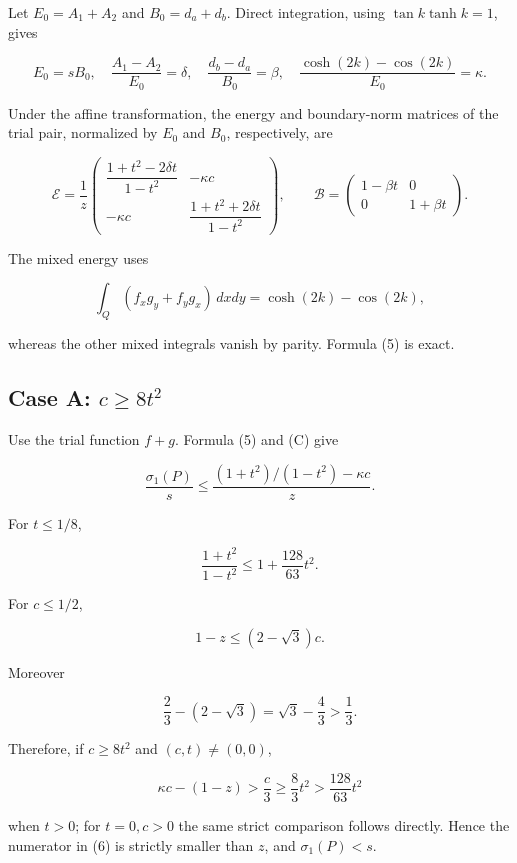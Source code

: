 \documentclass[11pt,a4paper]{article}
\begin{document}
Let \(E_0=A_1+A_2\) and \(B_0=d_a+d_b\). Direct integration, using
\(\tan k \tanh k=1\), gives

\[
E_0=sB_0,\quad
\frac{A_1-A_2}{E_0}=\delta,\quad
\frac{d_b-d_a}{B_0}=\beta,
\quad
\frac{\cosh(2k)-\cos(2k)}{E_0}=\kappa.
\]

Under the affine transformation, the energy and boundary-norm matrices
of the trial pair, normalized by \(E_0\) and \(B_0\), respectively, are

\[
\mathcal E=\frac1z
\begin{pmatrix}
\dfrac{1+t^2-2\delta t}{1-t^2}&-\kappa c\\[3pt]
-\kappa c&\dfrac{1+t^2+2\delta t}{1-t^2}
\end{pmatrix},
\qquad
\mathcal B=\begin{pmatrix}1-\beta t&0\\0&1+\beta t\end{pmatrix}.
\tag{5}
\]

The mixed energy uses

\[
\int_Q(f_xg_y+f_yg_x)\,dxdy
=\cosh(2k)-\cos(2k),
\]

whereas the other mixed integrals vanish by parity. Formula (5) is
exact.

\hypertarget{022-case-a-c8t2}{%
\subsection{\texorpdfstring{Case A:
\(c\ge 8t^2\)}{Case A: c >= 8t2}}\label{022-case-a-c8t2}}

Use the trial function \(f+g\). Formula (5) and (C) give

\[
\frac{\sigma_1(P)}s
\le\frac{(1+t^2)/(1-t^2)-\kappa c}{z}.
\tag{6}
\]

For \(t\le 1/8\),

\[
\frac{1+t^2}{1-t^2}\le1+\frac{128}{63}t^2.
\]

For \(c\le 1/2\),

\[
1-z\le(2-\sqrt3)c.
\]

Moreover

\[
\frac23-(2-\sqrt3)=\sqrt3-\frac43>\frac13.
\]

Therefore, if \(c\ge 8t^2\) and \((c,t)\ne (0,0)\),

\[
\kappa c-(1-z)>
\frac c3\ge\frac83t^2>\frac{128}{63}t^2
\]

when \(t>0\); for \(t=0,c>0\) the same strict comparison follows
directly. Hence the numerator in (6) is strictly smaller than \(z\), and
\(\sigma _1(P)<s\).
\end{document}
